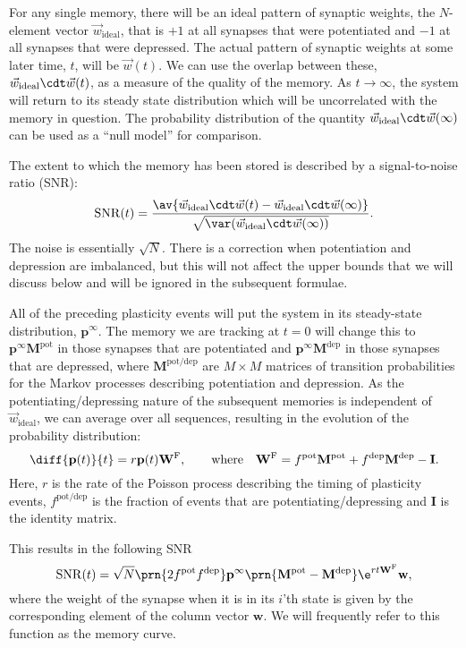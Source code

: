 \documentclass{article} %
\DeclareMathOperator{\snr}{SNR}
\newcommand{\wv}{\vec{w}}
\newcommand{\wvi}{\vec{w}_\text{ideal}}
\newcommand{\I}{\mathbf{I}}
\newcommand{\pr}{\mathbf{p}}
\newcommand{\eq}{\pr^\infty}
\newcommand{\w}{\mathbf{w}}
\newcommand{\W}{\mathbf{W}}
\newcommand{\M}{\mathbf{M}}
\newcommand{\frg}{\W^{\mathrm{F}}}
\newcommand{\pot}{^{\text{pot}}}
\newcommand{\dep}{^{\text{dep}}}
\newcommand{\potdep}{^{\text{pot/dep}}}
\begin{document}
For any single memory, there will be an ideal pattern of synaptic weights, the $N$-element vector $\wvi$, that is $+1$ at all synapses that were potentiated and $-1$ at all synapses that were depressed.
The actual pattern of synaptic weights at some later time, $t$, will be $\wv(t)$.
We can use the overlap between these, $\wvi\cdt\wv(t)$, as a measure of the quality of the memory.
As $t\to\infty$, the system will return to its steady state distribution which will be uncorrelated with the memory in question.
The probability distribution of the quantity $\wvi\cdt\wv(\infty)$ can be used as a ``null model'' for comparison.

The extent to which the memory has been stored is described by a signal-to-noise ratio (SNR):
%
\begin{equation}\label{eq:SNRdef}
  \snr(t) = \frac{\av{\wv_\text{ideal}\cdt\wv(t) - \wv_\text{ideal}\cdt\wv(\infty)}}
     {\sqrt{\var(\wv_\text{ideal}\cdt\wv(\infty))}}.
\end{equation}
%
The noise is essentially $\sqrt{N}$. 
There is a correction when potentiation and depression are imbalanced, but this will not affect the upper bounds that we will discuss below and will be ignored in the subsequent formulae.

All of the preceding plasticity events will put the system in its steady-state distribution, $\eq$.
The memory we are tracking at $t=0$ will change this to $\eq\M\pot$ in those synapses that are potentiated and $\eq\M\dep$ in those synapses that are depressed, where $\M\potdep$ are $M\times M$ matrices of transition probabilities for the Markov processes describing potentiation and depression.
As the potentiating/depressing nature of the subsequent memories is independent of $\wvi$, we can average over all sequences, resulting in the evolution of the probability distribution:
%
\begin{equation}\label{eq:evol}
  \diff{\pr(t)}{t} = r\pr(t)\frg,
  \qquad \text{where} \quad
  \frg = f\pot\M\pot + f\dep\M\dep - \I.
\end{equation}
%
Here, $r$ is the rate of the Poisson process describing the timing of plasticity events,
$f\potdep$ is the fraction of events that are potentiating/depressing and $\I$ is the identity matrix.

This results in the following SNR
%
\begin{equation}\label{eq:SNRcalc}
  \snr(t) = \sqrt{N}\prn{2 f\pot f\dep} \eq \prn{\M\pot-\M\dep} \e^{rt\frg} \w,
\end{equation}
%
where the weight of the synapse when it is in its $i$'th state is given by the corresponding element of the column vector $\w$.
We will frequently refer to this function as the memory curve.
\end{document}
